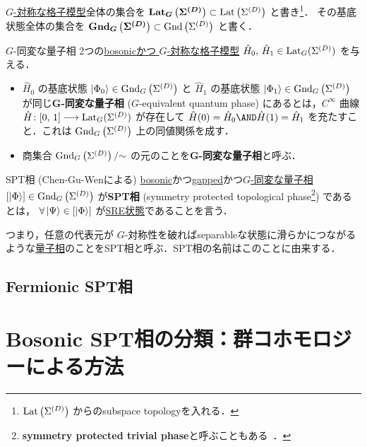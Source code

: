 \documentclass[TQFT_main]{subfiles}
\begin{document}
\hyperref[def:blat-G-equiv]{$G$-対称な格子模型}全体の集合を $\bm{\mathrm{Lat}_{G}\left(\Sigma^{(D)}\right)} \subset \mathrm{Lat}\left(\Sigma^{(D)}\right)$ と書き\footnote{$\mathrm{Lat}\left(\Sigma^{(D)}\right)$ からのsubspace topologyを入れる．}．
その基底状態全体の集合を $\bm{\mathrm{Gnd}_{G}\left(\Sigma^{(D)}\right)} \subset \mathrm{Gnd}\left(\Sigma^{(D)}\right)$ と書く．

\begin{mydefph}[label=def:Gequiv-bqp]{$G$-同変な量子相}
    2つの\hyperref[def:bosonic-lattice-model]{bosonicかつ $G$-対称な格子模型} $\hat{H}_0,\, \hat{H}_1 \in \mathrm{Lat}_G(\Sigma^{(D)})$ を与える．
    \begin{itemize}
        \item $\hat{H}_0$ の基底状態 $\ket{\Phi_0} \in \mathrm{Gnd}_{G}\left(\Sigma^{(D)}\right)$ と $\hat{H}_1$ の基底状態 $\ket{\Phi_1} \in \mathrm{Gnd}_{G}\left(\Sigma^{(D)}\right)$ が同じ\textbf{$\bm{G}$-同変な量子相} ($G$-equivalent quantum phase) にあるとは，$C^\infty$ 曲線 $\hat{H} \colon [0,\, 1] \longrightarrow \mathrm{Lat}_G(\Sigma^{(D)})$ が存在して
            $\hat{H}(0) = \hat{H}_0 \AND \hat{H}(1) = \hat{H}_1$ を充たすこと．これは $\mathrm{Gnd}_{G}\left(\Sigma^{(D)}\right)$ 上の同値関係を成す．
        \item 商集合 $\mathrm{Gnd}_{G}\left(\Sigma^{(D)}\right)/{\sim}$ の元のことを\textbf{$\bm{G}$-同変な量子相}と呼ぶ．
    \end{itemize}
\end{mydefph}

\begin{mydefph}[label=def:SPT-traditional]{SPT相 (Chen-Gu-Wenによる)}
    \hyperref[def:bosonic-lattice-model]{bosonic}かつ\hyperref[def:gapped]{gapped}かつ\hyperref[def:blat-G-equiv]{$G$-同変な量子相} $[\ket{\Phi}] \in \mathrm{Gnd}_{G}\left(\Sigma^{(D)}\right)$ が\textbf{SPT相} (symmetry protected topological phase\footnote{\textbf{symmetry protected trivial phase}と呼ぶこともある~\cite{Wen2014SPT}．}) であるとは，
    $\forall \ket{\Psi} \in [\ket{\Phi}]$ が\hyperref[def:SRE]{SRE状態}であることを言う．
\end{mydefph}
つまり，任意の代表元が $G$-対称性を破ればseparableな状態に滑らかにつながるような\hyperref[def:Gequiv-bqp]{量子相}のことをSPT相と呼ぶ．SPT相の名前はこのことに由来する．


\subsection{Fermionic SPT相}

\section{Bosonic SPT相の分類：群コホモロジーによる方法}
\end{document}
